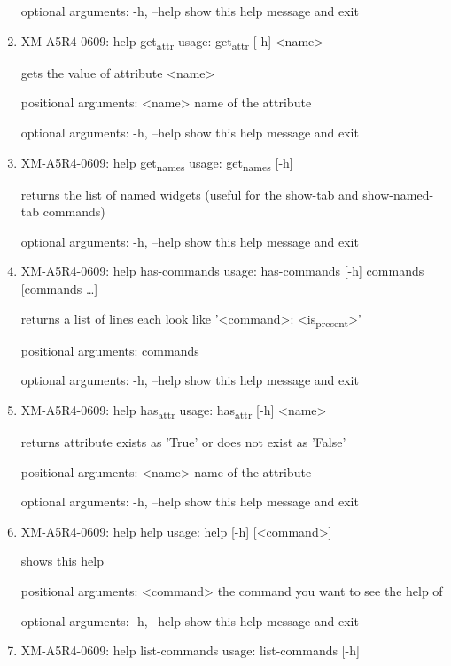 \documentclass[11pt]{article}
\begin{document}
\begin{enumerate}
optional arguments:
  -h, --help  show this help message and exit

\item XM-A5R4-0609: help get\textsubscript{attr}
\label{sec:orgdb8db17}
usage: get\textsubscript{attr} [-h] <name>

gets the value of attribute <name>

positional arguments:
  <name>      name of the attribute

optional arguments:
  -h, --help  show this help message and exit

\item XM-A5R4-0609: help get\textsubscript{names}
\label{sec:org22186ce}
usage: get\textsubscript{names} [-h]

returns the list of named widgets (useful for the show-tab and show-named-tab
commands)

optional arguments:
  -h, --help  show this help message and exit

\item XM-A5R4-0609: help has-commands
\label{sec:org8dfa02c}
usage: has-commands [-h] commands [commands \ldots{}]

returns a list of lines each look like '<command>: <is\textsubscript{present}>'

positional arguments:
  commands

optional arguments:
  -h, --help  show this help message and exit

\item XM-A5R4-0609: help has\textsubscript{attr}
\label{sec:orgecc6f1b}
usage: has\textsubscript{attr} [-h] <name>

returns attribute exists as 'True' or does not exist as 'False'

positional arguments:
  <name>      name of the attribute

optional arguments:
  -h, --help  show this help message and exit

\item XM-A5R4-0609: help help
\label{sec:orgc0d7f96}
usage: help [-h] [<command>]

shows this help

positional arguments:
  <command>   the command you want to see the help of

optional arguments:
  -h, --help  show this help message and exit

\item XM-A5R4-0609: help list-commands
\label{sec:orgf3e6a78}
usage: list-commands [-h]


\end{enumerate}
\end{document}
